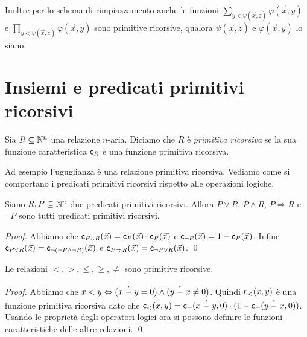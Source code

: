 \documentclass[runningheads,a4paper]{llncs}
\begin{document}
Inoltre per lo schema di rimpiazzamento anche le funzioni $\sum_{y < \psi(\vec x,z)} \varphi(\vec x,y)$ e $\prod_{y < \psi(\vec x,z)} \varphi(\vec x,y)$ sono primitive ricorsive, qualora $\psi(\vec x,z)$ e $\varphi(\vec x,y)$ lo siano.

\section{Insiemi e predicati primitivi ricorsivi}

\begin{definition}\label{def:prim-ric-pred}
Sia $R \subseteq \mathbb{N}^n$ una relazione $n$-aria. Diciamo che $R$ \`{e} \emph{primitiva ricorsiva} se la sua funzione caratteristica $\mathsf{c}_{R}$ \`{e} una funzione primitiva ricorsiva.
\end{definition}

Ad esempio l'uguglianza \`{e} una relazione primitiva ricorsiva. Vediamo come si comportano i predicati primitivi ricorsivi rispetto alle operazioni logiche.

\begin{lemma}\label{lem:log-clos}
Siano $R,P \subseteq \mathbb{N}^n$ due predicati primitivi ricorsivi. Allora $P \vee R$, $P \wedge R$, $P \Rightarrow R$ e $\neg P$ sono tutti predicati primitivi ricorsivi.
\end{lemma}

\begin{proof}
Abbiamo che $\mathsf{c}_{P \wedge R}(\vec x) = \mathsf{c}_{P}(\vec x) \cdot \mathsf{c}_{P}(\vec x)$ e $\mathsf{c}_{\neg P}(\vec x) = 1 - \mathsf{c}_{P}(\vec x)$. Infine $\mathsf{c}_{P \vee R}(\vec x) = \mathsf{c}_{\neg(\neg P \wedge \neg R)}(\vec x)$ e $\mathsf{c}_{P \Rightarrow R}(\vec x) = \mathsf{c}_{\neg P \vee R}(\vec x)$.
\qed\end{proof}

\begin{lemma}\label{lem:confronto}
Le relazioni $<,>,\leq,\geq,\neq$ sono primitive ricorsive.
\end{lemma}

\begin{proof}
Abbiamo che $x < y \Leftrightarrow (x \stackrel{\centerdot}{-} y = 0) \wedge (y \stackrel{\centerdot}{-} x \neq 0)$. Quindi $\mathsf{c}_{<}(x,y)$ \`{e} una funzione primitiva ricorsiva dato che $\mathsf{c}_{<}(x,y)=\mathsf{c}_{=}(x \stackrel{\centerdot}{-} y,0) \cdot (1- \mathsf{c}_{=}(y \stackrel{\centerdot}{-} x,0))$. Usando le propriet\`{a} degli operatori logici ora si possono definire le funzioni caratteristiche delle altre relazioni.
\qed\end{proof}
\end{document}
